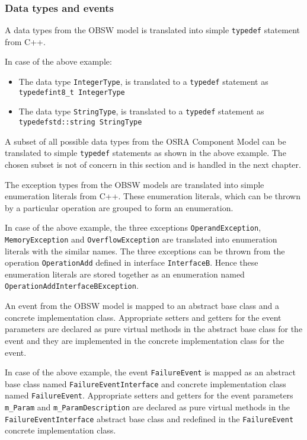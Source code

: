 \subsubsection{\textbf{Data types and events}}
A data types from the OBSW model is translated into simple \texttt{typedef} statement from C++.

In case of the above example:
\begin{itemize}
\item The data type \texttt{IntegerType}, is translated to a \texttt{typedef} statement as \texttt{typedef\allowbreak  int8\_t IntegerType}
\item The data type \texttt{StringType}, is translated to a \texttt{typedef} statement as \texttt{typedef\allowbreak std::string StringType} 
\end{itemize}

A subset of all possible data types from the OSRA Component Model can be translated to simple \texttt{typedef} statements as shown in the above example. The chosen subset is not of concern in this section and is handled in the next chapter. 

The exception types from the OBSW models are translated into simple enumeration literals from C++. These enumeration literals, which can be thrown by a particular operation are grouped to form an enumeration.

In case of the above example, the three exceptions \texttt{OperandException}, \texttt{MemoryException} and \texttt{OverflowException} are translated into enumeration literals with the similar names. The three exceptions can be thrown from the operation \texttt{OperationAdd} defined in interface \texttt{InterfaceB}. Hence these enumeration literals are stored together as an enumeration named \texttt{OperationAdd\allowbreak InterfaceB\allowbreak Exception}.

An event from the OBSW model is mapped to an abstract base class and a concrete implementation class. Appropriate setters and getters for the event parameters are declared as pure virtual methods in the abstract base class for the event and they are implemented in the concrete implementation class for the event.

In case of the above example, the event \texttt{FailureEvent} is mapped as an abstract base class named \texttt{FailureEvent\allowbreak Interface} and concrete implementation class named \texttt{FailureEvent}. Appropriate setters and getters for the event parameters \texttt{m\_Param} and \texttt{m\_ParamDescription} are declared as pure virtual methods in the \texttt{FailureEvent\allowbreak Interface} abstract base class and redefined in the \texttt{FailureEvent} concrete implementation class.   

